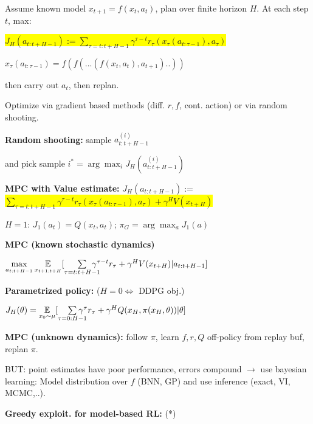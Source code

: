 \documentclass[11pt,landscape,a4paper,fleqn]{article}
\newcommand{\mhl}[1]{\setlength{\fboxsep}{0pt}\colorbox{yellow}{#1}}
\begin{document}
\begin{multicols*}{4}
	Assume known model $x_{t+1} = f(x_t, a_t)$, plan over finite horizon $H$. At each step $t$, max:

	\mhl{$J_H(a_{t:t+H-1}) := \sum_{\tau = t:t+H-1} \gamma^{\tau - t} r_\tau(x_\tau(a_{t:\tau-1}), a_\tau)$}

	$x_\tau(a_{t:\tau-1}) = f(f(...(f(x_t, a_t), a_{t+1})..))$

	then carry out $a_t$, then replan.

	Optimize via gradient based methods (diff. $r, f$, cont. action) or via random shooting.

	\textbf{Random shooting:} sample $a_{t:t+H-1}^{(i)}$

	\vspace*{-1mm}
	and pick sample $i^* = \arg\max_i J_H(a_{t:t+H-1}^{(i)})$

	\textbf{MPC with Value estimate:} $J_H(a_{t:t+H-1}) :=$
	\mhl{$\sum_{\tau = t:t+H-1} \gamma^{\tau - t} r_\tau(x_\tau(a_{t:\tau-1}), a_\tau) + \gamma^H V(x_{t+H})$}

	$H=1$: $J_1(a_t) = Q(x_t, a_t)$; $\pi_G = \arg\max_a J_1(a)$

	\textbf{MPC (known stochastic dynamics)}

	{\fontsize{10}{6}\selectfont $\max\limits_{a_{t:t+H-1}} \underset{x_{t+1:t+H}}{\mathbb{E}} [ \sum\limits_{\tau = t:t+H-1} \hspace*{-4mm} \gamma^{\tau - t} r_\tau + \gamma^H V(x_{t+H}) | a_{t:t+H-1} ]$}


	\textbf{Parametrized policy:} ($H = 0 \Leftrightarrow$ DDPG obj.)

	$J_H(\theta) = \underset{x_0 \sim \mu}{\mathbb{E}} [ \sum\limits_{\tau = 0:H-1} \hspace*{-4mm} \gamma^{\tau} r_\tau + \gamma^H Q(x_{H}, \pi(x_H, \theta)) | \theta ]$

	\textbf{MPC (unknown dynamics):} follow $\pi$, learn $f, r, Q$ off-policy from replay buf, replan $\pi$.

	BUT: point estimates have poor performance, errors compound $\rightarrow$ use bayesian learning:
	Model distribution over $f$ (BNN, GP) and use inference (exact, VI, MCMC,..).

	\textbf{Greedy exploit. for model-based RL:} \textcolor{mypink}{(*)}


\end{multicols*}
\end{document}
